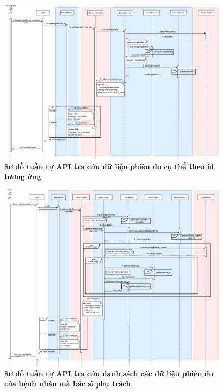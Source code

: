 \begin{figure}[H]
	\centering
	\includegraphics[width=16cm]{Images/api_sequence/record/getRecordById.drawio.png}
	\caption[Sơ đồ tuần tự API tra cứu dữ liệu phiên đo cụ thể theo id tương ứng]{\bfseries \fontsize{12pt}{0pt}\selectfont Sơ đồ tuần tự API tra cứu dữ liệu phiên đo cụ thể theo id tương ứng}
	\label{sequence_diagram_get_record_by_id}
\end{figure}

\begin{figure}[H]
	\centering
	\includegraphics[width=16cm]{Images/api_sequence/record/getRecordByDoctorId.drawio.png}
	\caption[Sơ đồ tuần tự API tra cứu danh sách các dữ liệu phiên đo của bệnh nhân mà bác sĩ phụ trách]{\bfseries \fontsize{12pt}{0pt}\selectfont Sơ đồ tuần tự API tra cứu danh sách các dữ liệu phiên đo của bệnh nhân mà bác sĩ phụ trách}
	\label{sequence_diagram_get_record_by_doctor_id}
\end{figure}

